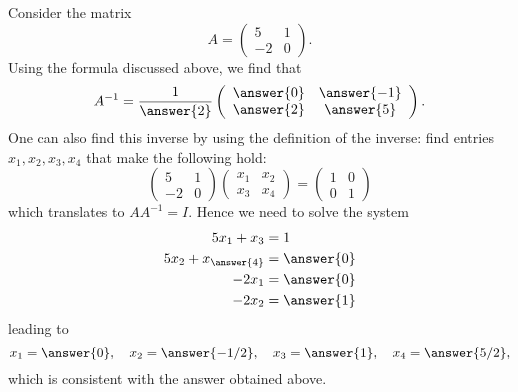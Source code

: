 \documentclass{ximera}
\begin{document}
Consider the matrix
\[
A= \left(\begin{array}{cc}
  5 &  1 \\
  -2 &  0
\end{array}\right).
\]
Using the formula discussed above, we find that
\begin{equation}\label{Amatrix}
A^{-1}= \frac{1}{\answer{2}} \left(\begin{array}{cc}
  \answer{0} &  \answer{-1} \\
  \answer{2} &  \answer{5}
\end{array}\right).
\end{equation}
One can also find this inverse by using the definition of the inverse: find entries $x_{1}, x_{2}, x_{3}, x_{4}$ that make the following hold:
\[
\left(\begin{array}{cc}
  5 &  1 \\
  -2 &  0
\end{array}\right) \left(\begin{array}{cc}
  x_{1} &  x_{2} \\
  x_{3} &  x_{4}
\end{array}\right)= \left(\begin{array}{cc}
  1 &  0 \\
  0 &  1
\end{array}\right)
\]
which translates to $AA^{-1}=I$. Hence we need to solve the system
\begin{align*}
5x_{1}+x_{3}&=1\\
5x_{2} + x_{\answer{4}} &= \answer{0}\\
-2x_{1}&= \answer{0}\\
-2x_{2} &= \answer{1}
\end{align*}
leading to
\begin{equation*}
  x_{1} = \answer{0}, \quad
  x_{2} =\answer{-1/2}, \quad
  x_{3} = \answer{1}, \quad
  x_{4} = \answer{5/2},
\end{equation*}
which is consistent with the answer obtained above.
\end{document}
